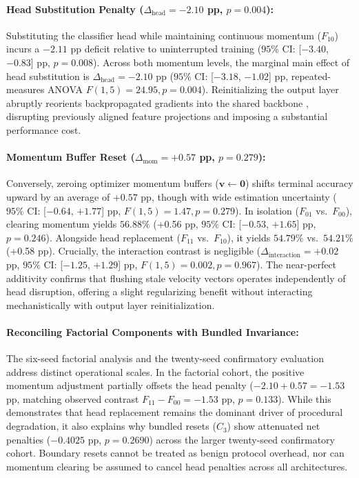 \documentclass[sn-mathphys,Numbered]{sn-jnl}
\begin{document}
\paragraph{Head Substitution Penalty ($\Delta_{\mathrm{head}} = -2.10$ pp, $p = 0.004$):}
Substituting the classifier head while maintaining continuous momentum ($F_{10}$) incurs a $-2.11$ pp deficit relative to uninterrupted training ($95\%$ CI: [$-3.40$, $-0.83$] pp, $p = 0.008$). Across both momentum levels, the marginal main effect of head substitution is $\Delta_{\mathrm{head}} = -2.10$ pp ($95\%$ CI: [$-3.18$, $-1.02$] pp, repeated-measures ANOVA $F(1, 5) = 24.95, p = 0.004$). Reinitializing the output layer abruptly reorients backpropagated gradients into the shared backbone \cite{lapacz2025exploring}, disrupting previously aligned feature projections and imposing a substantial performance cost.

\paragraph{Momentum Buffer Reset ($\Delta_{\mathrm{mom}} = +0.57$ pp, $p = 0.279$):}
Conversely, zeroing optimizer momentum buffers ($\bm{v} \leftarrow \mathbf{0}$) shifts terminal accuracy upward by an average of $+0.57$ pp, though with wide estimation uncertainty ($95\%$ CI: [$-0.64$, $+1.77$] pp, $F(1, 5) = 1.47, p = 0.279$). In isolation ($F_{01}$ vs.\ $F_{00}$), clearing momentum yields $56.88\%$ (+0.56 pp, $95\%$ CI: [$-0.53$, $+1.65$] pp, $p = 0.246$). Alongside head replacement ($F_{11}$ vs.\ $F_{10}$), it yields $54.79\%$ vs.\ $54.21\%$ (+0.58 pp). Crucially, the interaction contrast is negligible ($\Delta_{\mathrm{interaction}} = +0.02$ pp, $95\%$ CI: [$-1.25$, $+1.29$] pp, $F(1, 5) = 0.002, p = 0.967$). The near-perfect additivity confirms that flushing stale velocity vectors operates independently of head disruption, offering a slight regularizing benefit without interacting mechanistically with output layer reinitialization.

\paragraph{Reconciling Factorial Components with Bundled Invariance:}
The six-seed factorial analysis and the twenty-seed confirmatory evaluation address distinct operational scales. In the factorial cohort, the positive momentum adjustment partially offsets the head penalty ($-2.10 + 0.57 = -1.53$ pp, matching observed contrast $F_{11} - F_{00} = -1.53$ pp, $p = 0.133$). While this demonstrates that head replacement remains the dominant driver of procedural degradation, it also explains why bundled resets ($C_3$) show attenuated net penalties ($-0.4025$ pp, $p = 0.2690$) across the larger twenty-seed confirmatory cohort. Boundary resets cannot be treated as benign protocol overhead, nor can momentum clearing be assumed to cancel head penalties across all architectures.
\end{document}
